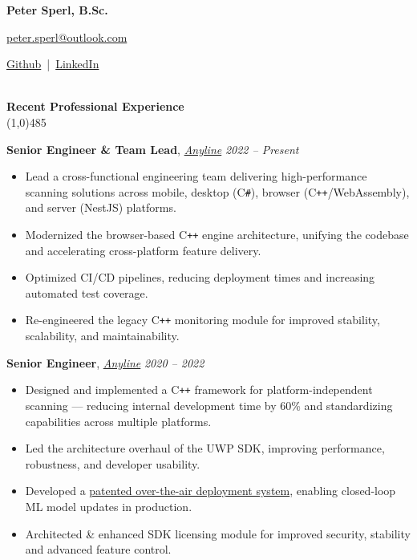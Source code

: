 \documentclass[9pt]{extarticle}
\newcommand\negativespace[1][-0.12cm]{\hspace*{#1}}
\begin{document}
	
\centerline{{\LARGE \bf Peter Sperl, B.Sc.}}
\centerline{\href{mailto:peter.sperl@outlook.com}{peter.sperl@outlook.com}}
\centerline{\href{https://github.com/leorean}{Github} \,|\, \href{https://www.linkedin.com/in/peter-sperl}{LinkedIn}}


\noindent %
\\
\vspace*{-6pt}
{\negativespace \Large \bf Recent Professional Experience}\\
\line(1,0){485}\\
\vspace*{3pt}

{\bf Senior Engineer \& Team Lead}, \textit{\href{https://anyline.com}{Anyline}} \hfill \textit{2022 -- Present}
\begin{itemize}
	\setlength\itemsep{0.05em}
	\item Lead a cross-functional engineering team delivering high-performance scanning solutions across mobile, desktop (C\texttt{\#}), browser (C\texttt{++}/WebAssembly), and server (NestJS) platforms.
	\item Modernized the browser-based C\texttt{++} engine architecture, unifying the codebase and accelerating cross-platform feature delivery.
	\item Optimized CI/CD pipelines, reducing deployment times and increasing automated test coverage.
	\item Re-engineered the legacy C\texttt{++} monitoring module for improved stability, scalability, and maintainability.	
\end{itemize}

{\bf Senior Engineer}, \textit{\href{https://anyline.com}{Anyline}} \hfill \textit{2020 -- 2022}
\begin{itemize}
	\setlength\itemsep{0.05em}
	\item Designed and implemented a C\texttt{++} framework for platform-independent scanning — reducing internal development time by 60\% and standardizing capabilities across multiple platforms.
	\item Led the architecture overhaul of the UWP SDK, improving performance, robustness, and developer usability.
	\item Developed a \href{https://patents.google.com/patent/US20220327849A1/en}{patented over-the-air deployment system}, enabling closed-loop ML model updates in production.
	\item Architected \& enhanced SDK licensing module for improved security, stability and advanced feature control.
\end{itemize}
\end{document}

